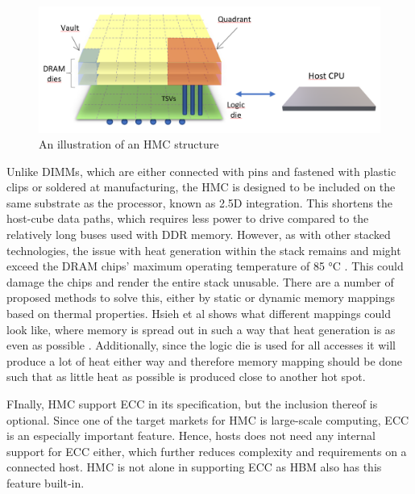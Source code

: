 \begin{figure}[!ht]
\centering
\includegraphics[width=0.75\linewidth]{figure/HMC-structure.png}
\caption{An illustration of an HMC structure }
\label{HMC-structure}
\end{figure}

Unlike DIMMs, which are either connected with pins and fastened with plastic clips or soldered at manufacturing, the HMC is designed to be included on the same substrate as the processor, known as 2.5D integration. This shortens the host-cube data paths, which requires less power to drive compared to the relatively long buses used with DDR memory. However, as with other stacked technologies, the issue with heat generation within the stack remains and might exceed the DRAM chips' maximum operating temperature of 85 °C \cite{7459470}. This could damage the chips and render the entire stack unusable. There are a number of proposed methods to solve this, either by static or dynamic memory mappings based on thermal properties. Hsieh et al shows what different mappings could look like, where memory is spread out in such a way that heat generation is as even as possible \cite{Hsieh:2013:TMM:2501626.2512457}. Additionally, since the logic die is used for all accesses it will produce a lot of heat either way and therefore memory mapping should be done such that as little heat as possible is produced close to another hot spot.
\bigskip

FInally, HMC support ECC in its specification, but the inclusion thereof is optional. Since one of the target markets for HMC is large-scale computing, ECC is an especially important feature. Hence, hosts does not need any internal support for ECC either, which further reduces complexity and requirements on a connected host. HMC is not alone in supporting ECC as HBM also has this feature built-in.

